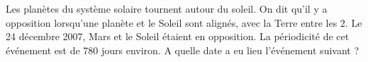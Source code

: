 
Les planètes du système solaire tournent autour du soleil. On dit qu'il y a opposition lorsqu'une planète et le Soleil sont alignés, avec la Terre entre les 2. Le 24 décembre 2007, Mars et le Soleil étaient en opposition. La périodicité de cet événement est de 780 jours environ. A quelle date a eu lieu l'événement suivant ?